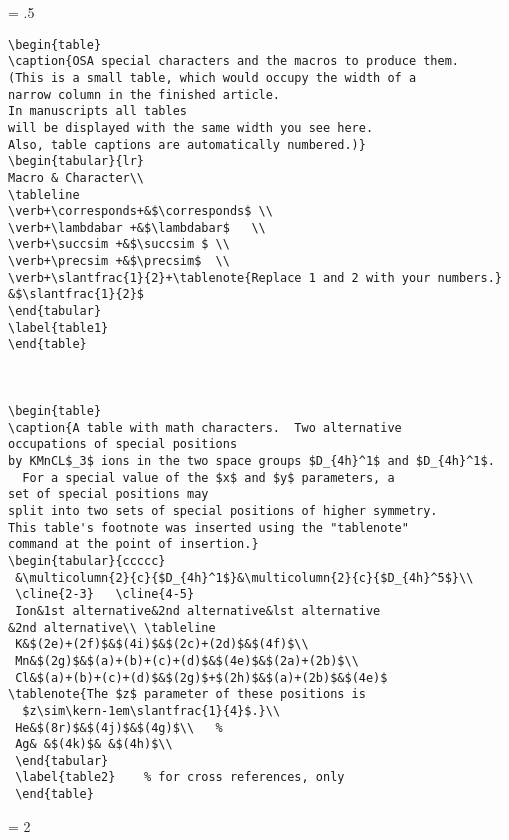 \newpage
\baselineskip = .5\baselineskip  %
\begin{verbatim}
\begin{table}
\caption{OSA special characters and the macros to produce them.
(This is a small table, which would occupy the width of a
narrow column in the finished article.
In manuscripts all tables
will be displayed with the same width you see here.
Also, table captions are automatically numbered.)}
\begin{tabular}{lr}
Macro & Character\\
\tableline
\verb+\corresponds+&$\corresponds$ \\
\verb+\lambdabar +&$\lambdabar$   \\
\verb+\succsim +&$\succsim $ \\
\verb+\precsim +&$\precsim$  \\
\verb+\slantfrac{1}{2}+\tablenote{Replace 1 and 2 with your numbers.}
&$\slantfrac{1}{2}$
\end{tabular}
\label{table1}
\end{table}



\begin{table}
\caption{A table with math characters.  Two alternative
occupations of special positions
by KMnCL$_3$ ions in the two space groups $D_{4h}^1$ and $D_{4h}^1$.
  For a special value of the $x$ and $y$ parameters, a
set of special positions may
split into two sets of special positions of higher symmetry.
This table's footnote was inserted using the "tablenote"
command at the point of insertion.}
\begin{tabular}{ccccc}
 &\multicolumn{2}{c}{$D_{4h}^1$}&\multicolumn{2}{c}{$D_{4h}^5$}\\
 \cline{2-3}   \cline{4-5}
 Ion&1st alternative&2nd alternative&lst alternative
&2nd alternative\\ \tableline
 K&$(2e)+(2f)$&$(4i)$&$(2c)+(2d)$&$(4f)$\\
 Mn&$(2g)$&$(a)+(b)+(c)+(d)$&$(4e)$&$(2a)+(2b)$\\
 Cl&$(a)+(b)+(c)+(d)$&$(2g)$+$(2h)$&$(a)+(2b)$&$(4e)$
\tablenote{The $z$ parameter of these positions is
  $z\sim\kern-1em\slantfrac{1}{4}$.}\\
 He&$(8r)$&$(4j)$&$(4g)$\\   %
 Ag& &$(4k)$& &$(4h)$\\
 \end{tabular}
 \label{table2}    % for cross references, only
 \end{table}

\end{verbatim} \newpage
\baselineskip = 2\baselineskip  %

